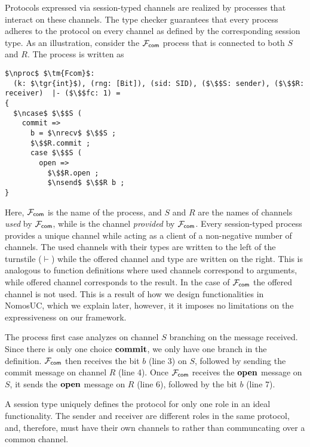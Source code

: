 Protocols expressed via session-typed channels are realized by processes that interact on these channels.
The type checker guarantees that every process adheres to the protocol on every channel as defined by
the corresponding session type.
As an illustration, consider the $\mathcal{F}_{{\mathsf {com}}}$ process that is connected
to both $S$ and $R$.
The process is written as
\begin{lstlisting}[basicstyle=\footnotesize\BeraMonottFamily, frame=single, mathescape]
$\nproc$ $\tm{Fcom}$: 
  (k: $\tgr{int}$), (rng: [Bit]), (sid: SID), ($\$$S: sender), ($\$$R: receiver)  |- ($\$$fc: 1) =
{
  $\ncase$ $\$$S (
    commit => 
      b = $\nrecv$ $\$$S ;
      $\$$R.commit ;
      case $\$$S (
        open => 
          $\$$R.open ;
          $\nsend$ $\$$R b ;
}
\end{lstlisting}

Here, $\mathcal{F}_{{\mathsf {com}}}$ is the name of the process, and $S$ and $R$ are the names
of channels \emph{used} by $\mathcal{F}_{{\mathsf {com}}}$, while  is the channel \emph{provided}
by $\mathcal{F}_{{\mathsf {com}}}$.
Every session-typed process provides a unique channel while acting as a client
of a non-negative number of channels.
The used channels with their types are written to the left of the turnstile
($\vdash$) while the offered channel and type are written on the right.
This is analogous to function definitions where used channels correspond to
arguments, while offered channel corresponds to the result.
In the case of $\mathcal{F}_{{\mathsf {com}}}$ the offered channel  is not used. This is
a result of how we design functionalities in NomosUC, which we explain later, 
however, it it imposes no limitations on the expressiveness on our framework.

The process first case analyzes on channel $S$ branching on the
message received.
Since there is only one choice $\mathbf{commit}$, we only have one
branch in the definition.
$\mathcal{F}_{{\mathsf {com}}}$ then receives the bit $b$ (line 3) on $S$, followed by sending the
commit message on channel $R$ (line 4).
Once $\mathcal{F}_{{\mathsf {com}}}$ receives the $\mathbf{open}$ message on $S$, it sends the
$\mathbf{open}$ message on $R$ (line 6), followed by the bit $b$ (line 7).

A session type uniquely defines the protocol for only one role in an ideal functionality.
The sender and receiver are different roles in the same protocol, and, therefore, must have their own channels to \Fcom rather than communcating over a common channel.


